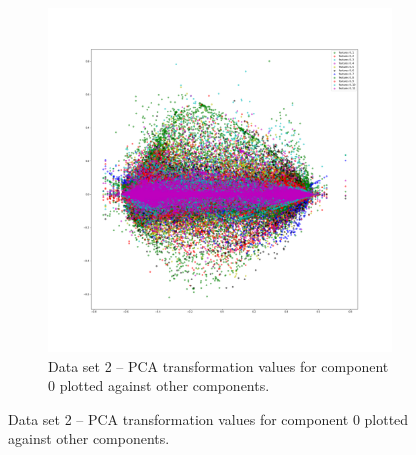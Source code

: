 \documentclass[
letterpaper, %
]{IEEEtran}
\begin{document}
	\begin{figure}[ht]\ContinuedFloat
		\begin{subfigure}{.5\textwidth}
			\centering
			\includegraphics[width=\linewidth]{./images/ds2/pca/scatter/12components.png}
			\caption{Data set 2 -- PCA transformation values for component 0 plotted against other components.}
			\label{fig:pcads2scatter}
		\end{subfigure}
	\end{figure}
\end{document}
